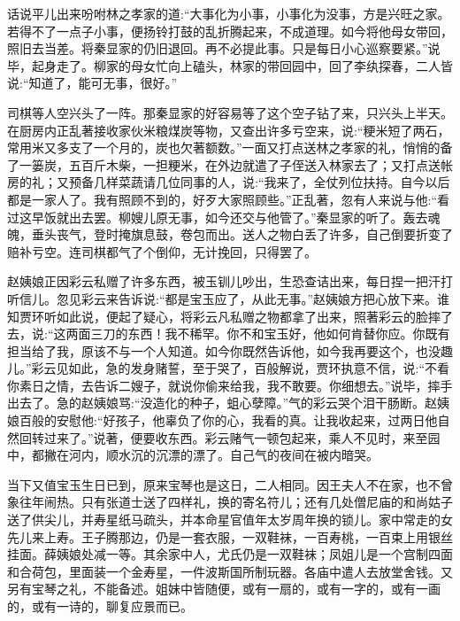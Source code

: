 

\begin{parag}
    话说平儿出来吩咐林之孝家的道:“大事化为小事，小事化为没事，方是兴旺之家。若得不了一点子小事，便扬铃打鼓的乱折腾起来，不成道理。如今将他母女带回，照旧去当差。将秦显家的仍旧退回。再不必提此事。只是每日小心巡察要紧。”说毕，起身走了。柳家的母女忙向上磕头，林家的带回园中，回了李纨探春，二人皆说:“知道了，能可无事，很好。”
\end{parag}


\begin{parag}
    司棋等人空兴头了一阵。那秦显家的好容易等了这个空子钻了来，只兴头上半天。在厨房内正乱著接收家伙米粮煤炭等物，又查出许多亏空来，说:“粳米短了两石，常用米又多支了一个月的，炭也欠著额数。”一面又打点送林之孝家的礼，悄悄的备了一篓炭，五百斤木柴，一担粳米，在外边就遣了子侄送入林家去了；又打点送帐房的礼；又预备几样菜蔬请几位同事的人，说:“我来了，全仗列位扶持。自今以后都是一家人了。我有照顾不到的，好歹大家照顾些。”正乱著，忽有人来说与他:“看过这早饭就出去罢。柳嫂儿原无事，如今还交与他管了。”秦显家的听了。轰去魂魄，垂头丧气，登时掩旗息鼓，卷包而出。送人之物白丢了许多，自己倒要折变了赔补亏空。连司棋都气了个倒仰，无计挽回，只得罢了。
\end{parag}


\begin{parag}
    赵姨娘正因彩云私赠了许多东西，被玉钏儿吵出，生恐查诘出来，每日捏一把汗打听信儿。忽见彩云来告诉说:“都是宝玉应了，从此无事。”赵姨娘方把心放下来。谁知贾环听如此说，便起了疑心，将彩云凡私赠之物都拿了出来，照著彩云的脸摔了去，说:“这两面三刀的东西！我不稀罕。你不和宝玉好，他如何肯替你应。你既有担当给了我，原该不与一个人知道。如今你既然告诉他，如今我再要这个，也没趣儿。”彩云见如此，急的发身赌誓，至于哭了，百般解说，贾环执意不信，说:“不看你素日之情，去告诉二嫂子，就说你偷来给我，我不敢要。你细想去。”说毕，摔手出去了。急的赵姨娘骂:“没造化的种子，蛆心孽障。”气的彩云哭个泪干肠断。赵姨娘百般的安慰他:“好孩子，他辜负了你的心，我看的真。让我收起来，过两日他自然回转过来了。”说著，便要收东西。彩云赌气一顿包起来，乘人不见时，来至园中，都撇在河内，顺水沉的沉漂的漂了。自己气的夜间在被内暗哭。
\end{parag}


\begin{parag}
    当下又值宝玉生日已到，原来宝琴也是这日，二人相同。因王夫人不在家，也不曾象往年闹热。只有张道士送了四样礼，换的寄名符儿；还有几处僧尼庙的和尚姑子送了供尖儿，并寿星纸马疏头，并本命星官值年太岁周年换的锁儿。家中常走的女先儿来上寿。王子腾那边，仍是一套衣服，一双鞋袜，一百寿桃，一百束上用银丝挂面。薛姨娘处减一等。其余家中人，尤氏仍是一双鞋袜；凤姐儿是一个宫制四面和合荷包，里面装一个金寿星，一件波斯国所制玩器。各庙中遣人去放堂舍钱。又另有宝琴之礼，不能备述。姐妹中皆随便，或有一扇的，或有一字的，或有一画的，或有一诗的，聊复应景而已。
\end{parag}


